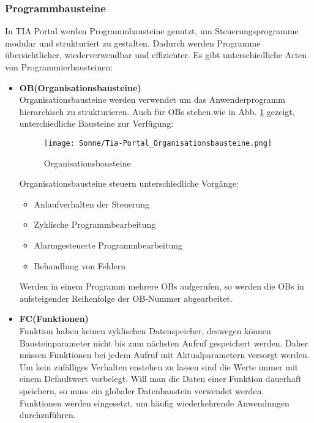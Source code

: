     \subsubsection[Programmbausteine]
    {Programmbausteine \cite{Programmierleitfaden_für_S7-1500}}
    
    In TIA Portal werden Programmbausteine genutzt, um Steuerungsprogramme modular und strukturiert zu gestalten. Dadurch werden Programme übersichtlicher, wiederverwendbar und effizienter. Es gibt unterschiedliche Arten von Programmierbausteinen:

    \begin{itemize}
        \item[1.] \textbf{OB(Organisationsbausteine)} \\
            Organisationsbausteine werden verwendet um das Anwenderprogramm hierarchisch zu strukturieren. Auch für OBs stehen,wie in Abb. \ref{Organisationsbausteine} gezeigt, unterchiedliche Bausteine zur Verfügung:
            \begin{figure}[h]
                \texttt{[image: Sonne/Tia-Portal\_Organisationsbausteine.png]}
                \caption{Organisationsbausteine \cite{Programmierleitfaden_für_S7-1500}}
                \label{Organisationsbausteine}
            \end{figure}

            Organisationsbausteine steuern unterschiedliche Vorgänge:
            \begin{itemize}
                \item Anlaufverhalten der Steuerung
                \item Zyklische Programmbearbeitung
                \item Alarmgesteuerte Programmbearbeitung
                \item Behandlung von Fehlern
            \end{itemize}
            Werden in einem Programm mehrere OBs aufgerufen, so werden die OBs in aufsteigender Reihenfolge der OB-Nummer abgearbeitet. 

        \item[2.] \textbf{FC(Funktionen)} \\
            Funktion haben keinen zyklischen Datenspeicher, deswegen können Bausteinparameter nicht bis zum nächsten Aufruf gespeichert werden. Daher müssen Funktionen bei jedem Aufruf mit Aktualparametern versorgt werden. Um kein zufälliges Verhalten enstehen zu lassen sind die Werte immer mit einem Defaultwert vorbelegt. Will man die Daten einer Funktion dauerhaft speichern, so muss ein globaler Datenbaustein verwendet werden.\\
            Funktionen werden eingesetzt, um häufig wiederkehrende Anwendungen durchzuführen.
            

\end{itemize}
